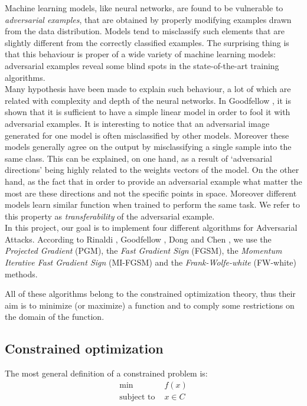 \documentclass[10pt,twocolumn,letterpaper, english]{article}
\theoremstyle{definition}
\theoremstyle{plain}
\theoremstyle{plain}
\theoremstyle{plain}
\theoremstyle{plain}
\theoremstyle{remark}
\theoremstyle{remark}
\theoremstyle{definition}
\theoremstyle{definition}
\theoremstyle{definition}
\theoremstyle{definition}
\begin{document}
Machine learning models, like neural networks, are found to be vulnerable to \textit{adversarial examples}, that are obtained by properly modifying examples drawn from the data distribution. 
Models tend to misclassify such elements that are slightly different from the correctly classified examples. 
The surprising thing is that this behaviour is proper of a wide variety of machine learning models: adversarial examples reveal some blind spots in the state-of-the-art training algorithms. \\

Many hypothesis have been made to explain such behaviour, a lot of which are related with complexity and depth of the neural networks. 
In Goodfellow \cite{goodfellow}, it is shown that it is sufficient to have a simple linear model in order to fool it with adversarial examples. It is interesting to notice that an adversarial image generated for one model is often misclassified by other models. 
Moreover these models generally agree on the output by misclassifying a single sample into the same class. This can be explained, on one hand, as a result of ‘adversarial directions’ being highly related to the weights vectors of the model. 
On the other hand, as the fact that in order to provide an adversarial example what matter the most are these directions and not the specific points in space. Moreover different models learn similar function when trained to perform the same task. We refer to this property as \textit{transferability} of the adversarial example. \\ 

In this project, our goal is to implement four different algorithms for Adversarial Attacks. 
According to Rinaldi \cite{rinaldi}, Goodfellow \cite{goodfellow}, Dong \cite{momentum} and Chen \cite{frank}, we use the \textit{Projected Gradient} (PGM), the \textit{Fast Gradient Sign} (FGSM), the \textit{Momentum Iterative Fast Gradient Sign} (MI-FGSM) and the \textit{Frank-Wolfe-white} (FW-white) methods. 

All of these algorithms belong to the constrained optimization theory, thus their aim is to minimize (or maximize) a function and to comply some restrictions on the domain of the function. 

\subsection{Constrained optimization}

The most general definition of a constrained problem is: 
\begin{align}
    \min \,&f(x) \label{min_prob} \\
    \text{subject to } &x \in C \nonumber
\end{align}
\end{document}
